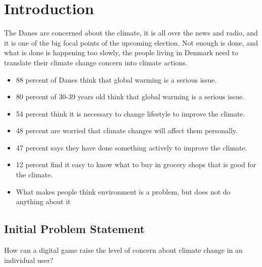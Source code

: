 \chapter{Introduction}\label{chap:introduction}

The Danes are concerned about the climate, it is all over the news and radio, and it is one of the big focal points of the upcoming election. Not enough is done, and what is done is happening too slowly, the people living in Denmark need to translate  their climate change concern into climate actions.









\begin{itemize}
    \item 88 percent of Danes think that global warming is a serious issue\cite{concito}.
    \item 80 percent of 30-39 years old think that global warming is a serious issue\cite{concito}.
    \item 54 percent think it is necessary to change lifestyle to improve the climate\cite{concito}.
    \item 48 percent are worried that climate changes will affect them personally\cite{concito}.
    \item 47 percent says they have done something actively to improve the climate\cite{concito}.
    \item 12 percent find it easy to know what to buy in grocery shops that is good for the climate\cite{concito}.
    \item What makes people think environment is a problem, but does not do anything about it
\end{itemize}

\section{Initial Problem Statement}
    How can a digital game raise the level of concern about climate change in an individual user?
    
    